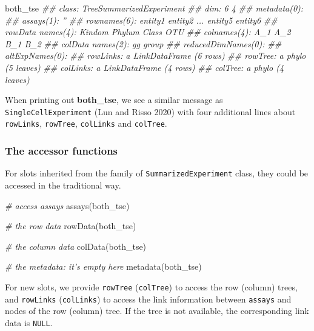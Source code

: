 \documentclass[]{article}
\newcommand{\hlcom}[1]{\textcolor[rgb]{0.502,0.502,0.502}{\textit{#1}}}%
\newcommand{\hlstd}[1]{\textcolor[rgb]{0.251,0.251,0.251}{#1}}%
\newcommand{\hlkwd}[1]{\textcolor[rgb]{0.878,0.439,0.125}{#1}}%
\newenvironment{Shaded}{\begin{myshaded}}{\end{myshaded}}
\newcommand{\KeywordTok}[1]{\hlkwd{#1}}
\newcommand{\CommentTok}[1]{\hlcom{#1}}
\newcommand{\NormalTok}[1]{\hlstd{#1}}
\begin{document}
\begin{Shaded}
\begin{Highlighting}[]
\NormalTok{both_tse}
\CommentTok{## class: TreeSummarizedExperiment }
\CommentTok{## dim: 6 4 }
\CommentTok{## metadata(0):}
\CommentTok{## assays(1): ''}
\CommentTok{## rownames(6): entity1 entity2 ... entity5 entity6}
\CommentTok{## rowData names(4): Kindom Phylum Class OTU}
\CommentTok{## colnames(4): A_1 A_2 B_1 B_2}
\CommentTok{## colData names(2): gg group}
\CommentTok{## reducedDimNames(0):}
\CommentTok{## altExpNames(0):}
\CommentTok{## rowLinks: a LinkDataFrame (6 rows)}
\CommentTok{## rowTree: a phylo (5 leaves)}
\CommentTok{## colLinks: a LinkDataFrame (4 rows)}
\CommentTok{## colTree: a phylo (4 leaves)}
\end{Highlighting}
\end{Shaded}

When printing out \textbf{both\_tse}, we see a similar message as
\texttt{SingleCellExperiment} (Lun and Risso 2020) with four additional lines about \texttt{rowLinks}, \texttt{rowTree},
\texttt{colLinks} and \texttt{colTree}.

\hypertarget{the-accessor-functions}{%
\subsubsection{The accessor functions}\label{the-accessor-functions}}

For slots inherited from the family of \texttt{SummarizedExperiment} class, they could be accessed in the traditional way.

\begin{Shaded}
\begin{Highlighting}[]
\CommentTok{# access assays}
\KeywordTok{assays}\NormalTok{(both_tse)}

\CommentTok{# the row data}
\KeywordTok{rowData}\NormalTok{(both_tse)}

\CommentTok{# the column data}
\KeywordTok{colData}\NormalTok{(both_tse)}

\CommentTok{# the metadata: it's empty here}
\KeywordTok{metadata}\NormalTok{(both_tse)}
\end{Highlighting}
\end{Shaded}

For new slots, we provide \texttt{rowTree} (\texttt{colTree}) to access the row (column) trees, and \texttt{rowLinks} (\texttt{colLinks}) to access the link information between \texttt{assays} and nodes of the row (column) tree. If the tree is not available, the corresponding link data is \texttt{NULL}.
\end{document}
